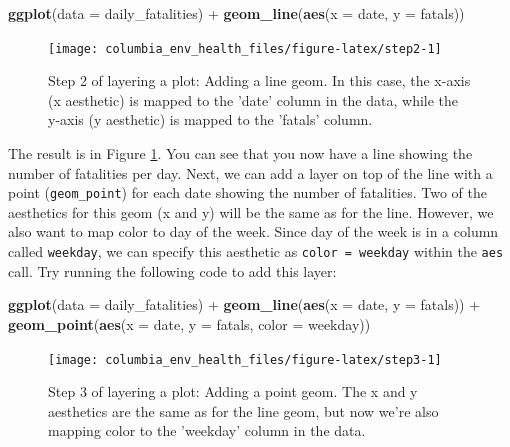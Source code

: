 \documentclass[]{tufte-book}
\newenvironment{Shaded}{}{}
\newcommand{\DataTypeTok}[1]{\textcolor[rgb]{0.56,0.13,0.00}{#1}}
\newcommand{\KeywordTok}[1]{\textcolor[rgb]{0.00,0.44,0.13}{\textbf{#1}}}
\newcommand{\NormalTok}[1]{#1}
\newcommand{\OperatorTok}[1]{\textcolor[rgb]{0.40,0.40,0.40}{#1}}
\newcommand{\StringTok}[1]{\textcolor[rgb]{0.25,0.44,0.63}{#1}}
\begin{document}
\begin{Shaded}
\begin{Highlighting}[]
\KeywordTok{ggplot}\NormalTok{(}\DataTypeTok{data =}\NormalTok{ daily_fatalities) }\OperatorTok{+}\StringTok{ }\KeywordTok{geom_line}\NormalTok{(}\KeywordTok{aes}\NormalTok{(}\DataTypeTok{x =}\NormalTok{ date, }
    \DataTypeTok{y =}\NormalTok{ fatals))}
\end{Highlighting}
\end{Shaded}

\begin{figure}
\texttt{[image: columbia\_env\_health\_files/figure-latex/step2-1]} \caption[Step 2 of layering a plot]{Step 2 of layering a plot: Adding a line geom. In this case, the x-axis (x aesthetic) is mapped to the 'date' column in the data, while the y-axis (y aesthetic) is mapped to the 'fatals' column.}\label{fig:step2}
\end{figure}

The result is in Figure \ref{fig:step2}. You can see that you now have a line showing
the number of fatalities per day. Next, we can add a layer on top of the line with a
point (\texttt{geom\_point}) for each date showing the number of fatalities. Two of the
aesthetics for this geom (x and y) will be the same as for the line. However, we
also want to map color to day of the week. Since day of the week is in a column
called \texttt{weekday}, we can specify this aesthetic as \texttt{color\ =\ weekday} within the \texttt{aes}
call. Try running the following code to add this layer:

\begin{Shaded}
\begin{Highlighting}[]
\KeywordTok{ggplot}\NormalTok{(}\DataTypeTok{data =}\NormalTok{ daily_fatalities) }\OperatorTok{+}\StringTok{ }\KeywordTok{geom_line}\NormalTok{(}\KeywordTok{aes}\NormalTok{(}\DataTypeTok{x =}\NormalTok{ date, }
    \DataTypeTok{y =}\NormalTok{ fatals)) }\OperatorTok{+}\StringTok{ }\KeywordTok{geom_point}\NormalTok{(}\KeywordTok{aes}\NormalTok{(}\DataTypeTok{x =}\NormalTok{ date, }\DataTypeTok{y =}\NormalTok{ fatals, }
    \DataTypeTok{color =}\NormalTok{ weekday))}
\end{Highlighting}
\end{Shaded}

\begin{figure}
\texttt{[image: columbia\_env\_health\_files/figure-latex/step3-1]} \caption[Step 3 of layering a plot]{Step 3 of layering a plot: Adding a point geom. The x and y aesthetics are the same as for the line geom, but now we're also mapping color to the 'weekday' column in the data.}\label{fig:step3}
\end{figure}
\end{document}
